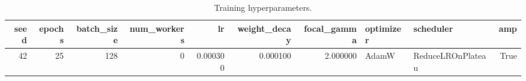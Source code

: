 \begin{table}
\caption{Training hyperparameters.}
\label{tab:hyperparameter_table}
\begin{tabular}{rrrrrrrllr}
\toprule
seed & epochs & batch\_size & num\_workers & lr & weight\_decay & focal\_gamma & optimizer & scheduler & amp \\
\midrule
42 & 25 & 128 & 0 & 0.000300 & 0.000100 & 2.000000 & AdamW & ReduceLROnPlateau & True \\
\bottomrule
\end{tabular}
\end{table}
